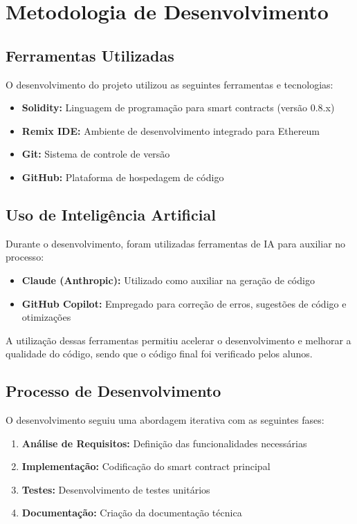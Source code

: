 \documentclass[12pt,a4paper]{article}
\begin{document}
\section{Metodologia de Desenvolvimento}

\subsection{Ferramentas Utilizadas}

O desenvolvimento do projeto utilizou as seguintes ferramentas e tecnologias:

\begin{itemize}
    \item \textbf{Solidity:} Linguagem de programação para smart contracts (versão 0.8.x)
    \item \textbf{Remix IDE:} Ambiente de desenvolvimento integrado para Ethereum
    \item \textbf{Git:} Sistema de controle de versão
    \item \textbf{GitHub:} Plataforma de hospedagem de código
\end{itemize}

\subsection{Uso de Inteligência Artificial}

Durante o desenvolvimento, foram utilizadas ferramentas de IA para auxiliar no processo:

\begin{itemize}
    \item \textbf{Claude (Anthropic):} Utilizado como auxiliar na geração de código
    \item \textbf{GitHub Copilot:} Empregado para correção de erros, sugestões de código e otimizações
\end{itemize}

A utilização dessas ferramentas permitiu acelerar o desenvolvimento e melhorar a qualidade do código, sendo que o código final foi verificado pelos alunos.

\subsection{Processo de Desenvolvimento}

O desenvolvimento seguiu uma abordagem iterativa com as seguintes fases:

\begin{enumerate}
    \item \textbf{Análise de Requisitos:} Definição das funcionalidades necessárias
    \item \textbf{Implementação:} Codificação do smart contract principal
    \item \textbf{Testes:} Desenvolvimento de testes unitários
    \item \textbf{Documentação:} Criação da documentação técnica
\end{enumerate}
\end{document}
